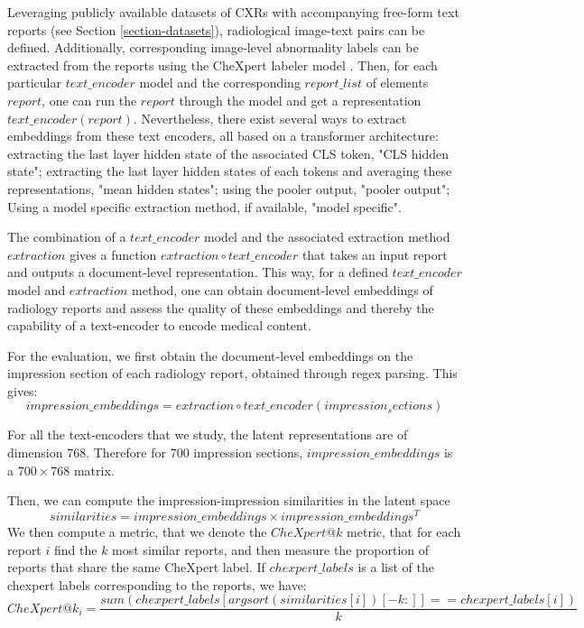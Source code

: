 \documentclass{article}
\begin{document}
Leveraging publicly available datasets of CXRs with accompanying free-form text reports (see Section \ref{section-datasets}), radiological image-text pairs can be defined. Additionally, corresponding image-level abnormality labels can be extracted from the reports using the CheXpert labeler model \citep{irvin2019chexpert}. Then, for each particular $text\_encoder$ model and the corresponding $report\_list$ of elements $report$, one can run the $report$ through the model and get a representation $text\_encoder(report)$. Nevertheless, there exist several ways to extract embeddings from these text encoders, all based on a transformer architecture: extracting the last layer hidden state of the associated CLS token, "CLS hidden state"; extracting the last layer hidden states of each tokens and averaging these representations, "mean hidden states"; using the pooler output, "pooler output"; Using a model specific extraction method, if available, "model specific".

The combination of a $text\_encoder$ model and the associated extraction method $extraction$ gives a function $extraction \circ text\_encoder$ that takes an input report and outputs a document-level representation. This way, for a defined $text\_encoder$ model and $extraction$ method, one can obtain document-level embeddings of radiology reports and assess the quality of these embeddings and thereby the capability of a text-encoder to encode medical content.

For the evaluation, we first obtain the document-level embeddings on the impression section of each radiology report, obtained through regex parsing. This gives:
$$
impression\_embeddings = extraction \circ text\_encoder(impression_sections)
$$

For all the text-encoders that we study, the latent representations are of dimension 768. Therefore for 700 impression sections, $impression\_embeddings$ is a $700 \times 768$ matrix. 

Then, we can compute the impression-impression similarities in the latent space $$similarities = impression\_embeddings \times  impression\_embeddings^{T}$$
We then compute a metric, that we denote the $CheXpert@k$ metric, that for each report $i$ find the $k$ most similar reports, and then measure the proportion of reports that share the same CheXpert label. If $chexpert\_labels$ is a list of the chexpert labels corresponding to the reports, we have:
$$
CheXpert@k_i = \frac{sum(chexpert\_labels[argsort(similarities[i])[-k:]]==chexpert\_labels[i])}{k}
$$
\end{document}
